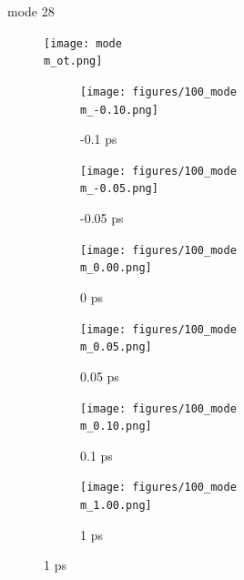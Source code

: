 \documentclass{beamer}
\newcommand\w{0.32}
\begin{document}
\renewcommand\m{28}
\begin{frame}{mode \m}
					\vspace{\vh mm}
	\begin{figure}
		\centering
		\texttt{[image: mode\\m\_ot.png]}
	\end{figure}
	\begin{figure}
		\centering
		\begin{subfigure}[b]{\w\textwidth}
			\centering
			\texttt{[image: figures/100\_mode\\m\_-0.10.png]}
			\caption{-0.1 ps}
		\end{subfigure}
		\begin{subfigure}[b]{\w\textwidth}
			\centering
			\texttt{[image: figures/100\_mode\\m\_-0.05.png]}
			\caption{-0.05 ps}
		\end{subfigure}
		\begin{subfigure}[b]{\w\textwidth}
			\centering
			\texttt{[image: figures/100\_mode\\m\_0.00.png]}
			\caption{0 ps}
		\end{subfigure}
		\begin{subfigure}[b]{\w\textwidth}
			\centering
			\texttt{[image: figures/100\_mode\\m\_0.05.png]}
			\caption{0.05 ps}
		\end{subfigure}
		\begin{subfigure}[b]{\w\textwidth}
			\centering
			\texttt{[image: figures/100\_mode\\m\_0.10.png]}
			\caption{0.1 ps}
		\end{subfigure}
		\begin{subfigure}[b]{\w\textwidth}
			\centering
			\texttt{[image: figures/100\_mode\\m\_1.00.png]}
			\caption{1 ps}
		\end{subfigure}
	\end{figure}
\end{frame}
\end{document}
